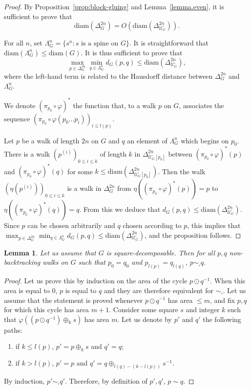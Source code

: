 \documentclass{article}
\newtheorem{lemma}[theorem]{Lemma}
\newcommand\quadcover[1]{\mathcal{U}^\square_{#1}}
\begin{document}
\begin{proof}
By Proposition~\ref{prop:block-gluing} and Lemma~\ref{lemma.even}, it is sufficient to prove that 
\[\textrm{diam}(\Delta_G^{2n}) = O\left( \textrm{diam}(\Delta_{\quadcover{G}}^{2n})\right).\]

For all $n$, set $\Lambda_G^{n} = \{s^{n} : s\text{ is a spine on }G\}$. It is straightforward that $\textrm{diam}(\Lambda_G^{n}) \le \textrm{diam}(G)$. It is thus sufficient to prove that
\[\max_{p \in \Delta_G^{2n}} \min_{q \in \Lambda_G^{n}} d_G(p,q) \leq \textrm{diam}(\Delta_{\quadcover{G}}^{2n}),\]
where the left-hand term is related to the Hausdorff distance between $\Delta_G^{2n}$ and $\Lambda_G^{n}$.

We denote $(\pi_{p_0}\circ \varphi)^{\ast}$ the function that, to a walk $p$ on $G$, associates the sequence $(\pi_{p_0}\circ \varphi(p_0 \ldots p_i))_{i \le l(p)}$.

Let $p$ be a walk of length $2n$ on $G$ and $q$ an element of $\Lambda_G^{n}$ which begins on $p_0$. There is a walk $(p^{(i)})_{0\le i\le k}$ of length $k$ in $\Delta_{\quadcover{G} [p_0]}^{2n}$ between $(\pi_{p_0}\circ \varphi)^{\ast} (p)$ and $(\pi_{p_0}\circ \varphi )^{\ast}(q)$ for some $k\le \textrm{diam}(\Delta_{\quadcover{G} [p_0]}^{2n})$. Then the walk $(\eta(p^{(i)}))_{0\le i\le k}$ is a walk in $\Delta_G^{2n}$ from $\eta((\pi_{p_0}\circ \varphi)^{\ast}(p)) = p$ to $\eta((\pi_{p_0}\circ \varphi)^{\ast}(q)
) = q$. 
From this we deduce that $d_G(p, q) \leq \textrm{diam}(\Delta_{\quadcover{G}}^{2n})$. Since $p$ can be chosen arbitrarily and $q$ chosen according to $p$, this implies that $\max_{p \in \Delta_G^{2n}} \min_{q \in \Lambda_G^{n}} d_G(p,q) \leq \textrm{diam}(\Delta_{\quadcover{G}}^{2n})$, and the proposition follows.
\end{proof}


\begin{lemma}\label{lemma:equivalence:walks}
Let us assume that $G$ is square-decomposable. Then 
for all $p,q$ non-backtracking walks on $G$ such that $p_0=q_0$ and $p_{l(p)} = q_{l(q)}$, $p \sim_{\square} q$.
\end{lemma}

\begin{proof}
Let us prove this by induction on the area of the cycle $p \odot q^{-1}$. When this area is equal to $0$, $p$ is equal to $q$ and they are therefore equivalent for $\sim_{\square}$. Let us assume that the statement is proved whenever $p \odot q^{-1}$ has area $\le m$, and fix $p,q$ for which this cycle has area $m+1$. Consider some square $s$ and integer $k$ such that $\varphi((p \odot q^{-1}) \oplus_k s)$ has area $m$. Let us denote by $p'$ and $q'$ the following paths:
\begin{enumerate}
    \item if $k\le l(p)$, $p' = p\oplus_k s$ and $q'=q$;
    \item if $k> l(p)$, $p'=p$ and $q' = q \oplus_{l(q)-(k-l(p))} s^{-1}$.
\end{enumerate}
By induction, $p' \sim_{\square} q'$. Therefore, by definition of $p',q'$, $p \sim q$.
\end{proof}
\end{document}

